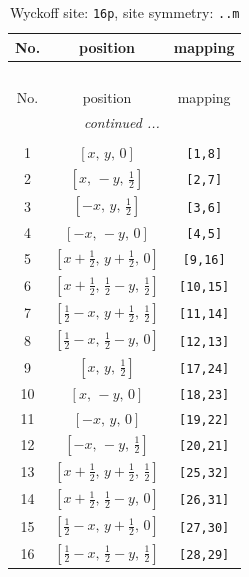 \documentclass[fleqn,8pt]{jsarticle}
\begin{document}
\renewcommand{\arraystretch}{1.2}
\begin{longtable}{ccc}
\caption{Wyckoff site: {\tt 16p}, site symmetry: {\tt ..m}}
 \\
 \hline \hline
No. & position & mapping \\ \hline \endfirsthead

\multicolumn{2}{l}{\tablename\ \thetable{}} \\
 \hline \hline
No. & position & mapping \\ \hline \endhead

 \hline \hline
\multicolumn{2}{r}{\footnotesize\it continued ...} \\ \endfoot

 \hline \hline
\multicolumn{2}{r}{} \\ \endlastfoot

1 & $\left[ x,\, y,\, 0 \right]$ & {\tt [1,8]} \\ \hline
2 & $\left[ x,\, - y,\, \frac{1}{2} \right]$ & {\tt [2,7]} \\ \hline
3 & $\left[ - x,\, y,\, \frac{1}{2} \right]$ & {\tt [3,6]} \\ \hline
4 & $\left[ - x,\, - y,\, 0 \right]$ & {\tt [4,5]} \\ \hline
5 & $\left[ x + \frac{1}{2},\, y + \frac{1}{2},\, 0 \right]$ & {\tt [9,16]} \\ \hline
6 & $\left[ x + \frac{1}{2},\, \frac{1}{2} - y,\, \frac{1}{2} \right]$ & {\tt [10,15]} \\ \hline
7 & $\left[ \frac{1}{2} - x,\, y + \frac{1}{2},\, \frac{1}{2} \right]$ & {\tt [11,14]} \\ \hline
8 & $\left[ \frac{1}{2} - x,\, \frac{1}{2} - y,\, 0 \right]$ & {\tt [12,13]} \\ \hline
9 & $\left[ x,\, y,\, \frac{1}{2} \right]$ & {\tt [17,24]} \\ \hline
10 & $\left[ x,\, - y,\, 0 \right]$ & {\tt [18,23]} \\ \hline
11 & $\left[ - x,\, y,\, 0 \right]$ & {\tt [19,22]} \\ \hline
12 & $\left[ - x,\, - y,\, \frac{1}{2} \right]$ & {\tt [20,21]} \\ \hline
13 & $\left[ x + \frac{1}{2},\, y + \frac{1}{2},\, \frac{1}{2} \right]$ & {\tt [25,32]} \\ \hline
14 & $\left[ x + \frac{1}{2},\, \frac{1}{2} - y,\, 0 \right]$ & {\tt [26,31]} \\ \hline
15 & $\left[ \frac{1}{2} - x,\, y + \frac{1}{2},\, 0 \right]$ & {\tt [27,30]} \\ \hline
16 & $\left[ \frac{1}{2} - x,\, \frac{1}{2} - y,\, \frac{1}{2} \right]$ & {\tt [28,29]} \\
\end{longtable}
\end{document}
